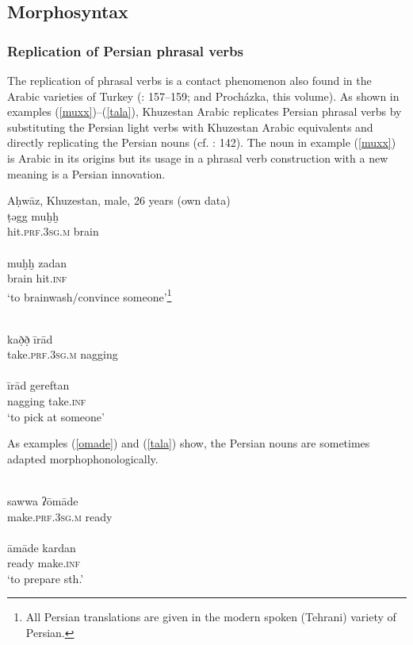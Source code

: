 \documentclass[output=paper,nonflat]{langsci/langscibook}
\begin{document}
\subsection{Morphosyntax}
\subsubsection{Replication of Persian phrasal verbs}

The replication of phrasal verbs is a contact phenomenon also found in the Arabic varieties of Turkey (\citealt{Grigore2007book}: 157–159; and Procházka, this volume). As shown in examples (\ref{muxx})--(\ref{tala}), Khuzestan Arabic replicates Persian phrasal verbs by substituting the Persian light verbs with Khuzestan Arabic equivalents and directly replicating the Persian nouns (cf. \citealt{MatrasShabibi2007}: 142). The noun in example (\ref{muxx}) is Arabic in its origins but its usage in a phrasal verb construction with a new meaning is a Persian innovation.

\ea\label{ex:key:} \label{muxx}
\ea Aḥwāz, Khuzestan, male, 26 years (own data)\\
\gll ṭəgg muḫḫ\\
     hit.\textsc{prf}.3\textsc{sg}.\textsc{m} brain\\ 
\\
\gll muḫḫ zadan\\
     brain hit.\textsc{inf} \\
\glt ‘to brainwash/convince someone’\footnote{All Persian translations are given in the modern spoken (Tehrani) variety of Persian.} 
\z
\z

\ea\label{ex:key:} \label{irad}
\\
\gll kað̣ð̣ īrād\\
     take.\textsc{prf}.3\textsc{sg}.\textsc{m} nagging\\ 
\\
\gll īrād gereftan\\
     nagging take.\textsc{inf}\\
\glt ‘to pick at someone’ 
\z\z

 As examples (\ref{omade}) and (\ref{tala}) show, the Persian nouns are sometimes adapted morphophonologically.

\ea\label{ex:key:} \label{omade}
\\
\gll sawwa ʔōmāde\\
     make.\textsc{prf}.3\textsc{sg}.\textsc{m} ready\\ 
\\
\gll āmāde kardan \\
     ready make.\textsc{inf}\\
\glt ‘to prepare sth.’
\z\z
\end{document}
